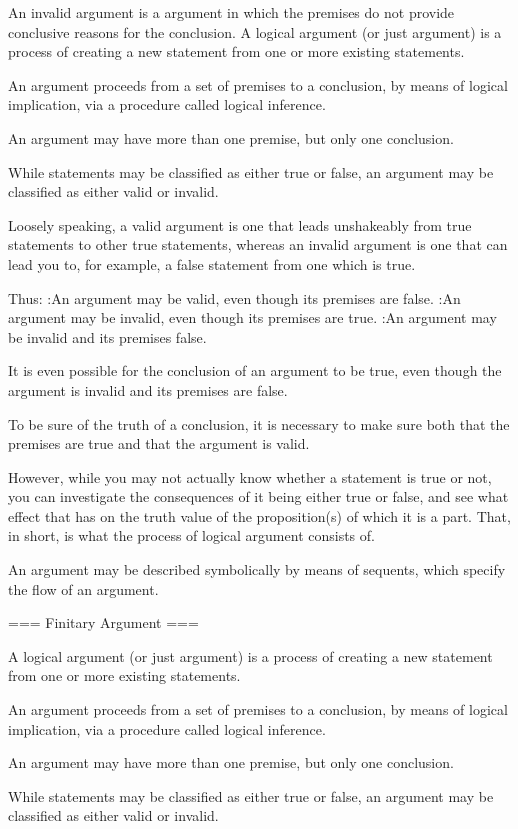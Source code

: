 An invalid argument is a argument in which the premises do not provide conclusive reasons for the conclusion.
A logical argument (or just argument) is a process of creating a new statement from one or more existing statements.

An argument proceeds from a set of premises to a conclusion, by means of logical implication, via a procedure called logical inference.


An argument may have more than one premise, but only one conclusion.


While statements may be classified as either true or false, an argument may be classified as either valid or invalid.


Loosely speaking, a valid argument is one that leads unshakeably from true statements to other true statements, whereas an invalid argument is one that can lead you to, for example, a false statement from one which is true.


Thus:
:An argument may be valid, even though its premises are false.
:An argument may be invalid, even though its premises are true.
:An argument may be invalid and its premises false.

It is even possible for the conclusion of an argument to be true, even though the argument is invalid and its premises are false.


To be sure of the truth of a conclusion, it is necessary to make sure both that the premises are true and that the argument is valid.


However, while you may not actually know whether a statement is true or not, you can investigate the consequences of it being either true or false, and see what effect that has on the truth value of the proposition(s) of which it is a part. That, in short, is what the process of logical argument consists of.


An argument may be described symbolically by means of sequents, which specify the flow of an argument.


=== Finitary Argument ===

A logical argument (or just argument) is a process of creating a new statement from one or more existing statements.

An argument proceeds from a set of premises to a conclusion, by means of logical implication, via a procedure called logical inference.


An argument may have more than one premise, but only one conclusion.


While statements may be classified as either true or false, an argument may be classified as either valid or invalid.



